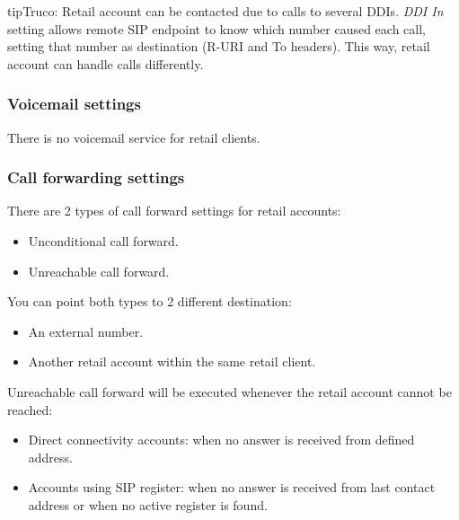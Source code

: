 \documentclass[letterpaper,10pt,spanish]{sphinxmanual}
\begin{document}
\begin{notice}{tip}{Truco:}
Retail account can be contacted due to calls to several DDIs. \emph{DDI In} setting allows remote SIP endpoint to
know which number caused each call, setting that number as destination (R-URI and To headers). This way, retail
account can handle calls differently.
\end{notice}


\subsubsection{Voicemail settings}
\label{administration_portal/client/retail/retail_accounts:voicemail-settings}
There is no voicemail service for retail clients.


\subsubsection{Call forwarding settings}
\label{administration_portal/client/retail/retail_accounts:call-forwarding-settings}
There are 2 types of call forward settings for retail accounts:
\begin{itemize}
\item {} 
Unconditional call forward.

\item {} 
Unreachable call forward.

\end{itemize}

You can point both types to 2 different destination:
\begin{itemize}
\item {} 
An external number.

\item {} 
Another retail account within the same retail client.

\end{itemize}

Unreachable call forward will be executed whenever the retail account cannot be reached:
\begin{itemize}
\item {} 
Direct connectivity accounts: when no answer is received from defined address.

\item {} 
Accounts using SIP register: when no answer is received from last contact address or when no active register is found.

\end{itemize}
\end{document}
